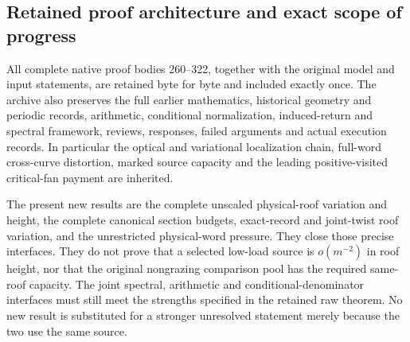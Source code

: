 \subsection*{Retained proof architecture and exact scope of progress}
All complete native proof bodies 260--322, together with the
original model and input statements, are retained byte for byte
and included exactly once. The archive also preserves the full
earlier mathematics, historical geometry and periodic records,
arithmetic, conditional normalization, induced-return and spectral
framework, reviews, responses, failed arguments and actual
execution records. In particular the optical and variational
localization chain, full-word cross-curve distortion, marked
source capacity and the leading positive-visited critical-fan
payment are inherited.

The present new results are the complete unscaled physical-roof
variation and height, the complete canonical section budgets,
exact-record and joint-twist roof variation, and the unrestricted
physical-word pressure. They close those precise interfaces.
They do not prove that a selected low-load source is
$o(m^{-2})$ in roof height, nor that the original nongrazing
comparison pool has the required same-roof capacity. The
joint spectral, arithmetic and conditional-denominator interfaces
must still meet the strengths specified in the retained raw
theorem. No new result is substituted for a stronger unresolved
statement merely because the two use the same source.
